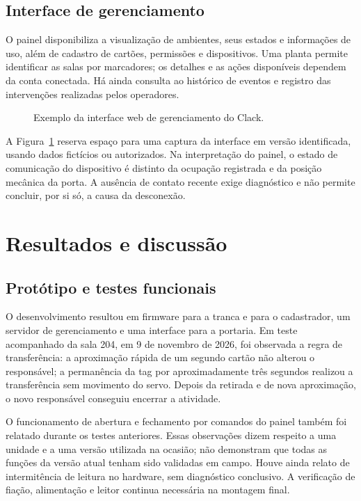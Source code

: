 \documentclass[12pt]{article}
\begin{document}
\subsection{Interface de gerenciamento}

O painel disponibiliza a visualização de ambientes, seus estados e informações de uso, além de cadastro de cartões, permissões e dispositivos. Uma planta permite identificar as salas por marcadores; os detalhes e as ações disponíveis dependem da conta conectada. Há ainda consulta ao histórico de eventos e registro das intervenções realizadas pelos operadores.

\begin{figure}[htbp]
  \centering
  \caption{Exemplo da interface web de gerenciamento do Clack.}
  \label{fig:painel}
\end{figure}

A Figura~\ref{fig:painel} reserva espaço para uma captura da interface em versão identificada, usando dados fictícios ou autorizados. Na interpretação do painel, o estado de comunicação do dispositivo é distinto da ocupação registrada e da posição mecânica da porta. A ausência de contato recente exige diagnóstico e não permite concluir, por si só, a causa da desconexão.

\section{Resultados e discussão}

\subsection{Protótipo e testes funcionais}

O desenvolvimento resultou em firmware para a tranca e para o cadastrador, um servidor de gerenciamento e uma interface para a portaria. Em teste acompanhado da sala 204, em 9 de novembro de 2026, foi observada a regra de transferência: a aproximação rápida de um segundo cartão não alterou o responsável; a permanência da tag por aproximadamente três segundos realizou a transferência sem movimento do servo. Depois da retirada e de nova aproximação, o novo responsável conseguiu encerrar a atividade.

O funcionamento de abertura e fechamento por comandos do painel também foi relatado durante os testes anteriores. Essas observações dizem respeito a uma unidade e a uma versão utilizada na ocasião; não demonstram que todas as funções da versão atual tenham sido validadas em campo. Houve ainda relato de intermitência de leitura no hardware, sem diagnóstico conclusivo. A verificação de fiação, alimentação e leitor continua necessária na montagem final.
\end{document}
